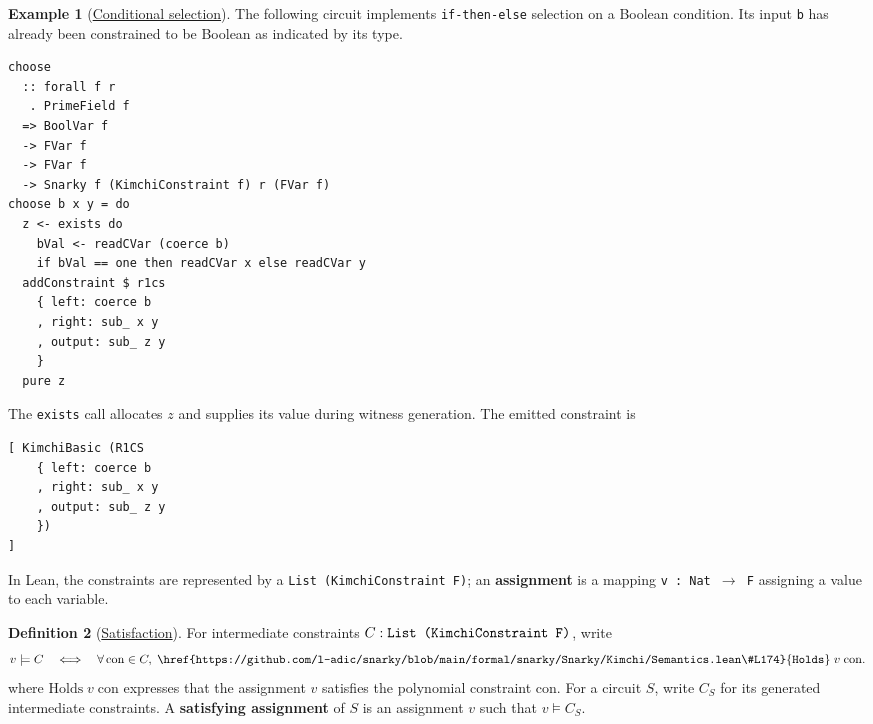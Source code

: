 \documentclass[11pt,a4paper]{article}
\newcommand{\inlinecode}[1]{\mbox{\texttt{#1}}}
\newenvironment{schematicblock}
  {\par\noindent\begin{minipage}{\linewidth}}
  {\end{minipage}\par}
\theoremstyle{definition}
\newtheorem{example}{Example}[section]
\theoremstyle{insetstatement}
\newtheorem{definitiontext}[example]{Definition}
\newenvironment{statementblock}
  {\begin{list}{}{%
    \setlength{\leftmargin}{0pt}%
    \setlength{\rightmargin}{0pt}%
    \setlength{\labelwidth}{0pt}%
    \setlength{\labelsep}{0pt}%
    \setlength{\itemindent}{0pt}%
    \setlength{\listparindent}{0pt}%
    \setlength{\topsep}{.7\baselineskip plus 2pt minus 1pt}%
    \setlength{\partopsep}{0pt}%
    \setlength{\parsep}{0pt}%
    \setlength{\itemsep}{0pt}}%
    \item\relax}
  {\end{list}}
\newenvironment{definition}[1][]
  {\begin{statementblock}\begin{definitiontext}[{#1}]}
  {\end{definitiontext}\end{statementblock}}
\begin{document}
\begin{example}[\href{https://github.com/l-adic/snarky/blob/main/formal/snarky/Snarky/DSL/Boolean.lean\#L71}{Conditional selection}]
\label{ex:conditional-selection}
The following circuit implements \inlinecode{if-then-else} selection on a Boolean
condition. Its input \inlinecode{b} has already been constrained to be Boolean
as indicated by its type.


\begin{lstlisting}[style=schematic,mathescape=false,morekeywords={forall,do,if,then,else}]
choose
  :: forall f r
   . PrimeField f
  => BoolVar f
  -> FVar f
  -> FVar f
  -> Snarky f (KimchiConstraint f) r (FVar f)
choose b x y = do
  z <- exists do
    bVal <- readCVar (coerce b)
    if bVal == one then readCVar x else readCVar y
  addConstraint $ r1cs
    { left: coerce b
    , right: sub_ x y
    , output: sub_ z y
    }
  pure z
\end{lstlisting}
The \inlinecode{exists} call allocates $z$ and supplies its value during
witness generation. The emitted constraint is
\begin{schematicblock}
\begin{lstlisting}[style=schematic,mathescape=false]
[ KimchiBasic (R1CS
    { left: coerce b
    , right: sub_ x y
    , output: sub_ z y
    })
]
\end{lstlisting}
\end{schematicblock}
\end{example}

In Lean, the constraints are represented by a \inlinecode{List (KimchiConstraint F)};
an \textbf{assignment} is a mapping \inlinecode{v : Nat $\to$ F} assigning a value to each variable.

\begin{definition}[\href{https://github.com/l-adic/snarky/blob/main/formal/snarky/Snarky/Kimchi/Semantics.lean\#L174}{Satisfaction}]
\label{def:constraint-satisfaction}
For intermediate constraints $C : \text{\inlinecode{List (KimchiConstraint F)}}$,
write
\[
  v\models C
  \quad\Longleftrightarrow\quad
  \forall\,\mathrm{con}\in C,\;
    \href{https://github.com/l-adic/snarky/blob/main/formal/snarky/Snarky/Kimchi/Semantics.lean\#L174}{\mathtt{Holds}}\;v\;\mathrm{con}.
\]
where $\mathrm{Holds}\;v\;\mathrm{con}$ expresses that the assignment $v$ satisfies
the polynomial constraint $\mathrm{con}$. For a circuit $S$, write $C_S$ for its
generated intermediate constraints. A \textbf{satisfying assignment} of $S$ is an assignment $v$
such that $v\models C_S$.
\end{definition}
\end{document}
